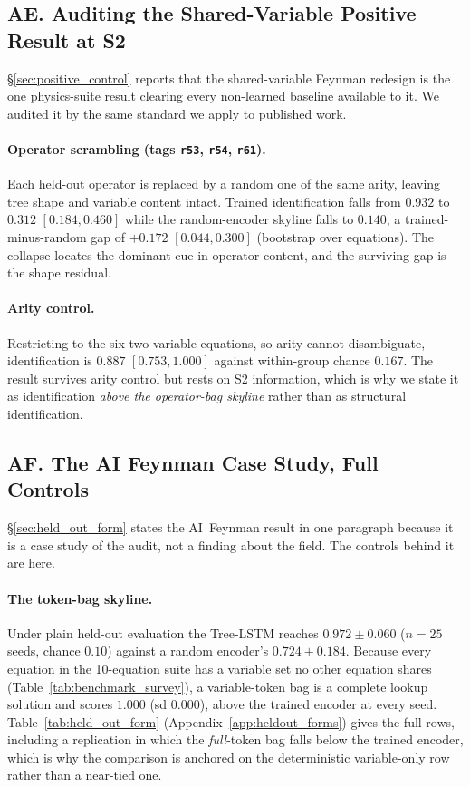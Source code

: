 \subsection*{AE. Auditing the Shared-Variable Positive Result at S2}

\S\ref{sec:positive_control} reports that the shared-variable Feynman redesign is the one physics-suite result clearing every non-learned baseline available to it. We audited it by the same standard we apply to published work.

\paragraph{Operator scrambling (tags \texttt{r53}, \texttt{r54}, \texttt{r61}).} Each held-out operator is replaced by a random one of the same arity, leaving tree shape and variable content intact. Trained identification falls from $0.932$ to $0.312$ $[0.184, 0.460]$ while the random-encoder skyline falls to $0.140$, a trained-minus-random gap of $+0.172$ $[0.044, 0.300]$ (bootstrap over equations). The collapse locates the dominant cue in operator content, and the surviving gap is the shape residual.

\paragraph{Arity control.} Restricting to the six two-variable equations, so arity cannot disambiguate, identification is $0.887$ $[0.753, 1.000]$ against within-group chance $0.167$. The result survives arity control but rests on S2 information, which is why we state it as identification \emph{above the operator-bag skyline} rather than as structural identification.

\subsection*{AF. The AI Feynman Case Study, Full Controls}

\S\ref{sec:held_out_form} states the AI~Feynman result in one paragraph because it is a case study of the audit, not a finding about the field. The controls behind it are here.

\paragraph{The token-bag skyline.} Under plain held-out evaluation the Tree-LSTM reaches $0.972 \pm 0.060$ ($n{=}25$ seeds, chance $0.10$) against a random encoder's $0.724 \pm 0.184$. Because every equation in the 10-equation suite has a variable set no other equation shares (Table~\ref{tab:benchmark_survey}), a variable-token bag is a complete lookup solution and scores $1.000$ (sd $0.000$), above the trained encoder at every seed. Table~\ref{tab:held_out_form} (Appendix~\ref{app:heldout_forms}) gives the full rows, including a replication in which the \emph{full}-token bag falls below the trained encoder, which is why the comparison is anchored on the deterministic variable-only row rather than a near-tied one.

